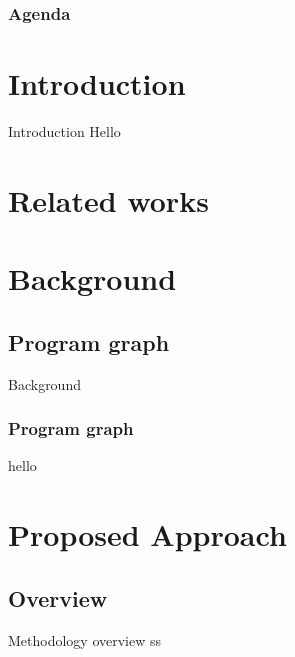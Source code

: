 \documentclass{beamer}
\title{\ThesisNameEN}
\subtitle{IMECS2017}
\date[2017.03.14]{\today}
\author{\authorNameEN~\small{and~\advisorEn}}
\institute{{\facultyEn}, {\universityEn}}
\begin{document}
\begin{frame}
    \maketitle
\end{frame}

\begin{frame}[t]
    \frametitle{Agenda}
    \tableofcontents
\end{frame}

\section{Introduction}
\begin{frame}{Introduction}
  Hello
\end{frame}


\section{Related works}

\section{Background}
\subsection{Program graph}
\begin{frame}{Background}
    \frametitle{Program graph}
    hello
\end{frame}

\section{Proposed Approach}
\subsection{Overview}
\begin{frame}[t]{Methodology overview}
ss
\end{frame}
\end{document}

